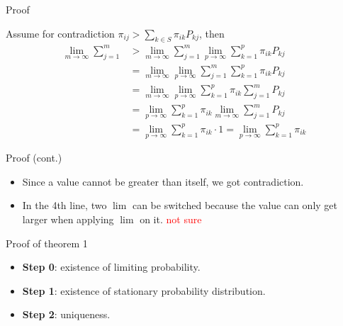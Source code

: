 \documentclass[mathserif]{beamer}
\begin{document}
\begin{frame}{Proof}

		Assume for contradiction $\pi_{ij} > \sum_{k \in S} \pi_{ik} P_{kj}$, then
		\begin{align*}
		\lim_{m\to\infty}\sum_{j=1}^m & > \lim_{m\to\infty}\sum_{j=1}^m 
		\lim_{p\to\infty}\sum_{k=1}^p \pi_{ik}P_{kj} \\
		& = \lim_{m\to\infty}\lim_{p\to\infty}\sum_{j=1}^m \sum_{k=1}^p \pi_{ik}P_{kj} \\
		& = \lim_{m\to\infty}\lim_{p\to\infty}\sum_{k=1}^p \pi_{ik} \sum_{j=1}^m P_{kj} \\
		& = \lim_{p\to\infty}\sum_{k=1}^p \pi_{ik} \lim_{m\to\infty}\sum_{j=1}^m P_{kj} \\
		& = \lim_{p\to\infty}\sum_{k=1}^p \pi_{ik} \cdot 1 = \lim_{p\to\infty}\sum_{k=1}^p \pi_{ik}
		\end{align*}
		
		

\end{frame}

\begin{frame}{Proof (cont.)}
\begin{itemize}
\item Since a value cannot be greater than itself, we got contradiction.
\item In the 4th line, two $\lim$ can be switched because the value can only get larger when applying $\lim$ on it. \textcolor{red}{not sure}
\end{itemize}
\end{frame}

\begin{frame}{Proof of theorem 1}\label{thm1_proof}
	\begin{itemize}
		\item \textbf{Step 0}: existence of limiting probability.
		\item \textbf{Step 1}: existence of stationary probability distribution.
		\item \textbf{Step 2}: uniqueness.
	\end{itemize}
\end{frame}
\end{document}

